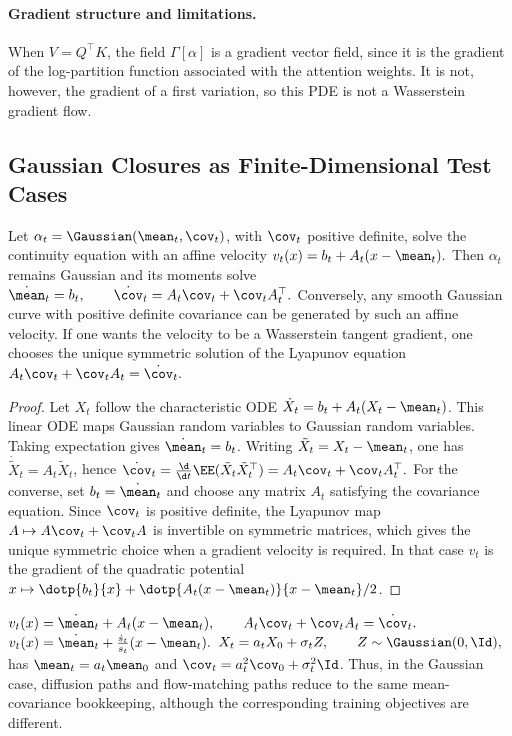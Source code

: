 \paragraph{Gradient structure and limitations.}
When $V=Q^\top K$, the field $\Gamma[\alpha]$ is a gradient vector field, since it is the gradient of the log-partition function associated with the attention weights. It is not, however, the gradient of a first variation, so this PDE is not a Wasserstein gradient flow.

\subsection{Gaussian Closures as Finite-Dimensional Test Cases}
\begin{prop}\label{prop-gaussian-affine-closure}
Let $\alpha_t=\Gaussian(\mean_t,\cov_t)$, with $\cov_t$ positive definite, solve the continuity equation with an affine velocity
\(v_t(x)=b_t+A_t(x-\mean_t).\)
Then $\alpha_t$ remains Gaussian and its moments solve
\(\dot \mean_t=b_t, \qquad \dot\cov_t=A_t\cov_t+\cov_t A_t^\top.\)
Conversely, any smooth Gaussian curve with positive definite covariance can be generated by such an affine velocity. If one wants the velocity to be a Wasserstein tangent gradient, one chooses the unique symmetric solution of the Lyapunov equation
\(A_t\cov_t+\cov_t A_t=\dot\cov_t.\)
\end{prop}
\begin{proof}
Let $X_t$ follow the characteristic ODE $\dot X_t=b_t+A_t(X_t-\mean_t)$. This linear ODE maps Gaussian random variables to Gaussian random variables. Taking expectation gives $\dot\mean_t=b_t$. Writing $\tilde X_t=X_t-\mean_t$, one has $\dot{\tilde X}_t=A_t\tilde X_t$, hence
\(\dot\cov_t = \frac{\d}{\d t}\EE(\tilde X_t\tilde X_t^\top) = A_t\cov_t+\cov_t A_t^\top.\)
For the converse, set $b_t=\dot\mean_t$ and choose any matrix $A_t$ satisfying the covariance equation. Since $\cov_t$ is positive definite, the Lyapunov map $A\mapsto A\cov_t+\cov_t A$ is invertible on symmetric matrices, which gives the unique symmetric choice when a gradient velocity is required. In that case $v_t$ is the gradient of the quadratic potential $x\mapsto \dotp{b_t}{x}+\dotp{A_t(x-\mean_t)}{x-\mean_t}/2$.
\end{proof}
\begin{example}
\(v_t(x)=\dot\mean_t+A_t(x-\mean_t), \qquad A_t\cov_t+\cov_t A_t=\dot\cov_t.\)
\(v_t(x)=\dot\mean_t+\frac{\dot s_t}{s_t}(x-\mean_t).\)
\(X_t=a_tX_0+\sigma_t Z,\qquad Z\sim\Gaussian(0,\Id),\)
has $\mean_t=a_t\mean_0$ and $\cov_t=a_t^2\cov_0+\sigma_t^2\Id$. Thus, in the Gaussian case, diffusion paths and flow-matching paths reduce to the same mean-covariance bookkeeping, although the corresponding training objectives are different.

\end{example}
